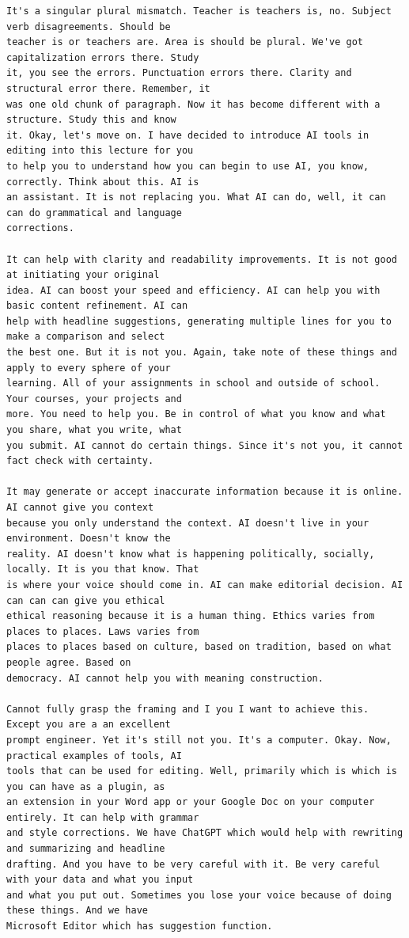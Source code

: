 {\begin{Verbatim}
It's a singular plural mismatch. Teacher is teachers is, no. Subject verb disagreements. Should be
teacher is or teachers are. Area is should be plural. We've got capitalization errors there. Study
it, you see the errors. Punctuation errors there. Clarity and structural error there. Remember, it
was one old chunk of paragraph. Now it has become different with a structure. Study this and know
it. Okay, let's move on. I have decided to introduce AI tools in editing into this lecture for you
to help you to understand how you can begin to use AI, you know, correctly. Think about this. AI is
an assistant. It is not replacing you. What AI can do, well, it can can do grammatical and language
corrections.

It can help with clarity and readability improvements. It is not good at initiating your original
idea. AI can boost your speed and efficiency. AI can help you with basic content refinement. AI can
help with headline suggestions, generating multiple lines for you to make a comparison and select
the best one. But it is not you. Again, take note of these things and apply to every sphere of your
learning. All of your assignments in school and outside of school. Your courses, your projects and
more. You need to help you. Be in control of what you know and what you share, what you write, what
you submit. AI cannot do certain things. Since it's not you, it cannot fact check with certainty.

It may generate or accept inaccurate information because it is online. AI cannot give you context
because you only understand the context. AI doesn't live in your environment. Doesn't know the
reality. AI doesn't know what is happening politically, socially, locally. It is you that know. That
is where your voice should come in. AI can make editorial decision. AI can can can give you ethical
ethical reasoning because it is a human thing. Ethics varies from places to places. Laws varies from
places to places based on culture, based on tradition, based on what people agree. Based on
democracy. AI cannot help you with meaning construction.

Cannot fully grasp the framing and I you I want to achieve this. Except you are a an excellent
prompt engineer. Yet it's still not you. It's a computer. Okay. Now, practical examples of tools, AI
tools that can be used for editing. Well, primarily which is which is you can have as a plugin, as
an extension in your Word app or your Google Doc on your computer entirely. It can help with grammar
and style corrections. We have ChatGPT which would help with rewriting and summarizing and headline
drafting. And you have to be very careful with it. Be very careful with your data and what you input
and what you put out. Sometimes you lose your voice because of doing these things. And we have
Microsoft Editor which has suggestion function.


\end{Verbatim}}
